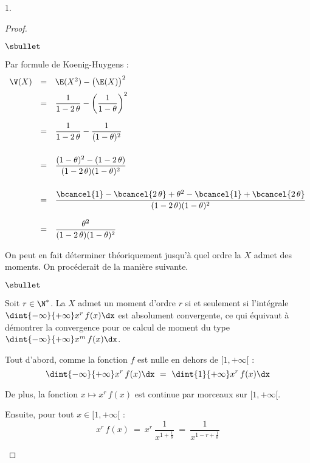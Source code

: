 \documentclass[11pt]{article}%
\begin{document}
\begin{noliste}{1.}
\begin{proof}
\begin{noliste}{$\sbullet$}
    \item Par formule de Koenig-Huygens :
      \[
        \begin{array}{rcl}
          \V(X) & = & \E(X^2) - \big(\E(X)\big)^2 
          \\[.2cm]
          & = & \dfrac{1}{1 - 2 \, \theta} - \left(\dfrac{1}{1-\theta}
                \right)^2
          \\[.6cm]
          & = & \dfrac{1}{1- 2 \, \theta} - \dfrac{1}{(1- \theta)^2}
          \\[.8cm]
          & = & \dfrac{(1-\theta)^2 - (1- 2 \, \theta)}{(1- 2 \,
                \theta) (1- \theta)^2}
          \\[.8cm]
          & = & \dfrac{\bcancel{1} - \bcancel{2 \, \theta} + \theta^2
                - \bcancel{1} + \bcancel{2 \, \theta}}{(1- 2 \,
                \theta) (1- \theta)^2}
          \\[.6cm]
          & = & \dfrac{\theta^2}{(1- 2 \, \theta) (1- \theta)^2}
        \end{array}
      \]
    \end{noliste}


    \newpage

    
    \begin{remark}
      On peut en fait déterminer théoriquement jusqu'à quel ordre la
      \var $X$ admet des moments. On procéderait de la manière
      suivante.
      \begin{noliste}{$\sbullet$}
      \item Soit $r \in \N^*$. La \var $X$ admet un moment d'ordre $r$
        si et seulement si l'intégrale $\dint{-\infty}{+\infty} x^r \,
        f(x) \dx$ est absolument convergente, ce qui équivaut à
        démontrer la convergence pour ce calcul de moment du type
        $\dint{-\infty}{+\infty} x^m \, f(x) \dx$.
        
      \item Tout d'abord, comme la fonction $f$ est nulle en dehors de
        $[1,+\infty[$ :
        \[
          \dint{-\infty}{+\infty} x^r \, f(x) \dx \ = \
          \dint{1}{+\infty} x^r \, f(x) \dx
        \]
        
      \item De plus, la fonction $x \mapsto x^r \, f(x)$ est continue
        par morceaux sur $[1,+\infty[$.
        
      \item Ensuite, pour tout $x \in [1,+\infty[$ :
        \[
          x^r \, f(x) \ = \ x^r \ \dfrac{1}{x^{1+\frac{1}{\theta}}} \
          = \ \dfrac{1}{x^{1-r+ \frac{1}{\theta}}}
        \]
        

\end{noliste}
\end{remark}
\end{proof}
\end{noliste}
\end{document}
